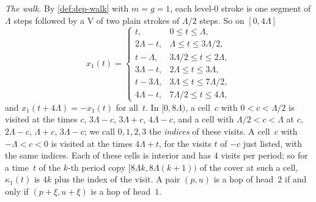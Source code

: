 \begin{informalproof}
\emph{The walk.} By \cref{def:dep-walk} with $m=g=1$, each level-$0$ stroke is one segment of $\Lambda$ steps followed
by a V of two plain strokes of $\Lambda/2$ steps. So on $[0,4\Lambda]$
\[
  x_1(t)=\begin{cases}
  t,&0\le t\le\Lambda,\\
  2\Lambda-t,&\Lambda\le t\le3\Lambda/2,\\
  t-\Lambda,&3\Lambda/2\le t\le2\Lambda,\\
  3\Lambda-t,&2\Lambda\le t\le3\Lambda,\\
  t-3\Lambda,&3\Lambda\le t\le7\Lambda/2,\\
  4\Lambda-t,&7\Lambda/2\le t\le4\Lambda,
  \end{cases}
\]
and $x_1(t+4\Lambda)=-x_1(t)$ for all~$t$. In $[0,8\Lambda)$, a cell~$c$ with $0<c<\Lambda/2$ is visited at the times
$c$, $3\Lambda-c$, $3\Lambda+c$, $4\Lambda-c$, and a cell with $\Lambda/2<c<\Lambda$ at $c$, $2\Lambda-c$,
$\Lambda+c$, $3\Lambda-c$; we call $0,1,2,3$ the \emph{indices} of these visits. A cell~$c$ with $-\Lambda<c<0$ is
visited at the times $4\Lambda+t$, for the visits $t$ of $-c$ just listed, with the same indices. Each of these cells
is interior and has $4$ visits per period; so for a time~$t$ of the $k$-th period copy $[8\Lambda k,8\Lambda(k+1))$ of
the cover at such a cell, $\kappa_1(t)$ is $4k$ plus the index of the visit. A pair $(p,u)$ is a hop of head~$2$ if and
only if $(p+\xi,u+\xi)$ is a hop of head~$1$.


\end{informalproof}
